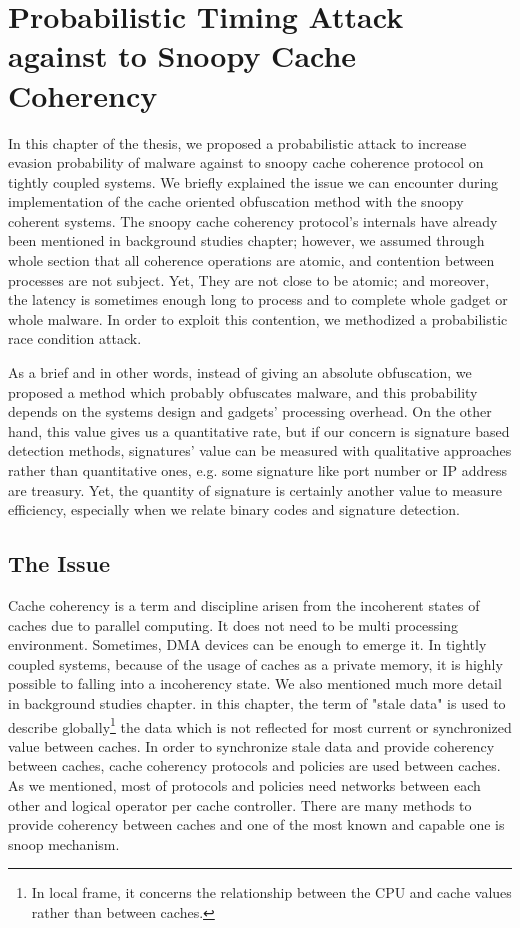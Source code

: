 \chapter{Probabilistic Timing Attack against to Snoopy Cache Coherency}
In this chapter of the thesis, we proposed a probabilistic attack to increase evasion probability of malware against to snoopy cache coherence protocol on tightly coupled systems. We briefly explained the issue we can encounter during implementation of the cache oriented obfuscation method with the snoopy coherent systems. The snoopy cache coherency protocol's internals have already been mentioned in background studies chapter; however, we assumed through whole section that all coherence operations are atomic, and contention between processes are not subject. Yet, They are not close to be atomic; and moreover, the latency is sometimes enough long to process and to complete whole gadget or whole malware. In order to exploit this contention, we methodized a probabilistic race condition attack. 

As a brief and in other words, instead of giving an absolute obfuscation, we proposed a method which probably obfuscates malware, and this probability depends on the systems design and gadgets' processing overhead. On the other hand, this value gives us a quantitative rate, but if our concern is signature based detection methods, signatures' value can be measured with qualitative approaches rather than quantitative ones, e.g. some signature like port number or IP address are treasury.  Yet, the quantity of signature is certainly another value to measure efficiency, especially when we relate binary codes and signature detection.

\section{The Issue}
Cache coherency is a term and discipline arisen from the incoherent states of caches due to parallel computing. It does not need to be multi processing environment. Sometimes, DMA devices can be enough to emerge it. In tightly coupled systems, because of the usage of caches as a private memory, it is highly possible to falling into a incoherency state. We also mentioned much more detail in background studies chapter. in this chapter, the term of "stale data" is used to describe globally\footnote{In local frame, it concerns the relationship between the CPU and cache values rather than between caches. } the data which is not reflected for most current or synchronized value between caches. In order to synchronize stale data and provide coherency between caches, cache coherency protocols and policies are used between caches. As we mentioned, most of  protocols and policies need networks between each other and logical operator per cache controller. There are many methods to provide coherency between caches and one of the most known and capable one is snoop mechanism. 

